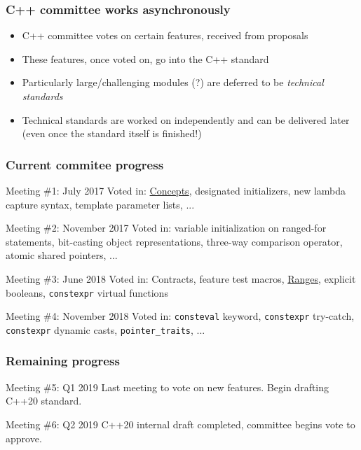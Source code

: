 \documentclass{beamer}
\begin{document}

\begin{frame}
\frametitle{C++ committee works asynchronously}
\begin{itemize} \setlength\itemsep{2 em} %
\item C++ committee votes on certain features, received from proposals
\item These features, once voted on, go into the C++ standard
\item Particularly large/challenging modules (?) are deferred to be \emph{technical standards}
\item Technical standards are worked on independently and can be delivered later (even once the standard itself is finished!)
\end{itemize}
\end{frame}


\begin{frame}
\frametitle{Current commitee progress}
{ 
\begin{block}{Meeting \#1: July 2017}
Voted in: \underline{Concepts}, designated initializers, new lambda capture syntax, template parameter lists, ...
\end{block}

\begin{block}{Meeting \#2: November 2017}
Voted in: variable initialization on ranged-for statements, bit-casting object representations, three-way comparison operator, atomic shared pointers, ...
\end{block}

\begin{block}{Meeting \#3: June 2018}
Voted in: Contracts, feature test macros, \underline{Ranges}, explicit booleans, \texttt{constexpr} virtual functions
\end{block}

\begin{block}{Meeting \#4: November 2018}
Voted in: \texttt{consteval} keyword, \texttt{constexpr} try-catch, \texttt{constexpr} dynamic casts, \texttt{pointer\_traits}, ...
\end{block}
}
\end{frame}

\begin{frame}
\frametitle{Remaining progress}
{ %
\begin{block}{Meeting \#5: Q1 2019}
Last meeting to vote on new features.
Begin drafting C++20 standard. 
\end{block}

\begin{block}{Meeting \#6: Q2 2019}
C++20 internal draft completed, committee begins vote to approve.
\end{block}
}
\end{frame}
\end{document}
